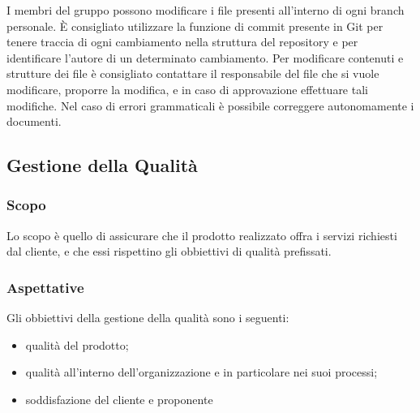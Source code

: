 			I membri del gruppo possono modificare i file presenti all'interno di ogni branch personale. È consigliato utilizzare la funzione di commit presente in Git per tenere traccia di ogni cambiamento nella struttura del repository e per identificare l'autore di un determinato cambiamento. Per modificare contenuti e strutture dei file è consigliato contattare il responsabile del file che si vuole modificare, proporre la modifica, e in caso di approvazione effettuare tali modifiche. Nel caso di errori grammaticali è possibile correggere autonomamente i documenti. 
	
	\subsection{Gestione della Qualità}
		\subsubsection{Scopo}
		Lo scopo è quello di assicurare che il prodotto realizzato offra i servizi richiesti dal cliente, e che essi rispettino gli obbiettivi di qualità prefissati.
		
		\subsubsection{Aspettative}
		Gli obbiettivi della gestione della qualità sono i seguenti:
		\begin{itemize}
			\item qualità del prodotto;
			\item qualità all'interno dell'organizzazione e in particolare nei suoi processi;
			\item soddisfazione del cliente e proponente
		\end{itemize}
		
